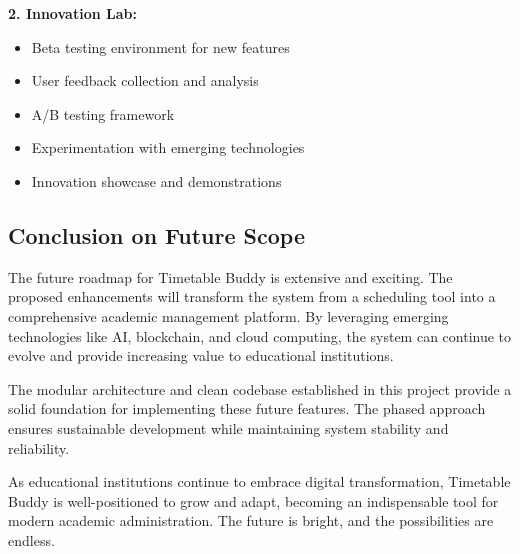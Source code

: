 \textbf{2. Innovation Lab:}
\begin{itemize}
    \item Beta testing environment for new features
    \item User feedback collection and analysis
    \item A/B testing framework
    \item Experimentation with emerging technologies
    \item Innovation showcase and demonstrations
\end{itemize}

\subsection{Conclusion on Future Scope}

The future roadmap for Timetable Buddy is extensive and exciting. The proposed enhancements will transform the system from a scheduling tool into a comprehensive academic management platform. By leveraging emerging technologies like AI, blockchain, and cloud computing, the system can continue to evolve and provide increasing value to educational institutions.

The modular architecture and clean codebase established in this project provide a solid foundation for implementing these future features. The phased approach ensures sustainable development while maintaining system stability and reliability.

As educational institutions continue to embrace digital transformation, Timetable Buddy is well-positioned to grow and adapt, becoming an indispensable tool for modern academic administration. The future is bright, and the possibilities are endless.
